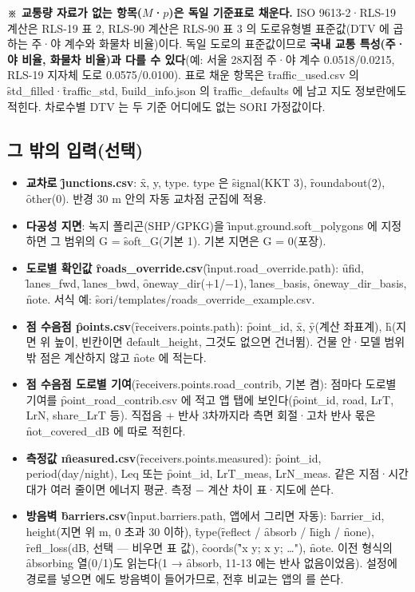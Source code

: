 \documentclass[10.5pt,a4paper]{article}
\begin{document}
\textbf{※ 교통량 자료가 없는 항목($M$·$p$)은 독일 기준표로 채운다.} ISO 9613-2·RLS-19 계산은 RLS-19 표 2, RLS-90 계산은 RLS-90 표 3 의 도로유형별 표준값(DTV 에 곱하는 주·야 계수와 화물차 비율)이다. 독일 도로의 표준값이므로 \textbf{국내 교통 특성(주·야 비율, 화물차 비율)과 다를 수 있다}(예: 서울 28지점 주·야 계수 0.0518/0.0215, RLS-19 지자체 도로 0.0575/0.0100). 표로 채운 항목은 \f{traffic\_used.csv} 의 \f{std\_filled}·\f{traffic\_std}, \f{build\_info.json} 의 \f{traffic\_defaults} 에 남고 지도 정보란에도 적힌다. 차로수별 DTV 는 두 기준 어디에도 없는 SORI 가정값이다.

\subsection{그 밖의 입력(선택)}
\begin{itemize}
\item \textbf{교차로 \f{junctions.csv}}: \f{x, y, type}. type 은 \f{signal}(KKT 3), \f{roundabout}(2), \f{other}(0). 반경 30 m 안의 자동 교차점 군집에 적용.
\item \textbf{다공성 지면}: 녹지 폴리곤(SHP/GPKG)을 \f{input.ground.soft\_polygons} 에 지정하면 그 범위의 G = \f{soft\_G}(기본 1). 기본 지면은 G = 0(포장).
\item \textbf{도로별 확인값 \f{roads\_override.csv}}(\f{input.road\_override.path}): \f{ufid}, \f{lanes\_fwd}, \f{lanes\_bwd}, \f{oneway\_dir}(+1/−1), \f{lanes\_basis}, \f{oneway\_dir\_basis}, \f{note}. 서식 예: \f{sori/templates/roads\_override\_example.csv}.
\item \textbf{점 수음점 \f{points.csv}}(\f{receivers.points.path}): \f{point\_id}, \f{x}, \f{y}(계산 좌표계), \f{h}(지면 위 높이, 빈칸이면 \f{default\_height}, 그것도 없으면 건너뜀). 건물 안·모델 범위 밖 점은 계산하지 않고 \f{note} 에 적는다.
\item \textbf{점 수음점 도로별 기여}(\f{receivers.points.road\_contrib}, 기본 켬): 점마다 도로별 기여를 \f{point\_road\_contrib.csv} 에 적고 앱  탭에 보인다(\f{point\_id, road, LrT, LrN, share\_LrT} 등). 직접음 + 반사 3차까지라 측면 회절·고차 반사 몫은 \f{not\_covered\_dB} 에 따로 적힌다.
\item \textbf{측정값 \f{measured.csv}}(\f{receivers.points.measured}): \f{point\_id, period(day/night), Leq} 또는 \f{point\_id, LrT\_meas, LrN\_meas}. 같은 지점·시간대가 여러 줄이면 에너지 평균. 측정 − 계산 차이 표·지도에 쓴다.
\item \textbf{방음벽 \f{barriers.csv}}(\f{input.barriers.path}, 앱에서 그리면 자동): \f{barrier\_id, height}(지면 위 m, 0 초과 30 이하), \f{type}(\f{reflect} / \f{absorb} / \f{high} / \f{none}), \f{refl\_loss}(dB, 선택 — 비우면 표 값), \f{coords}(\f{"x y; x y; …"}), \f{note}. 이전 형식의 \f{absorbing} 열(0/1)도 읽는다(1 → \f{absorb}, 11-13 에는 반사 없음이었음). 설정에 경로를 넣으면 에도 방음벽이 들어가므로, 전후 비교는 앱의 를 쓴다.

\end{itemize}
\end{document}
